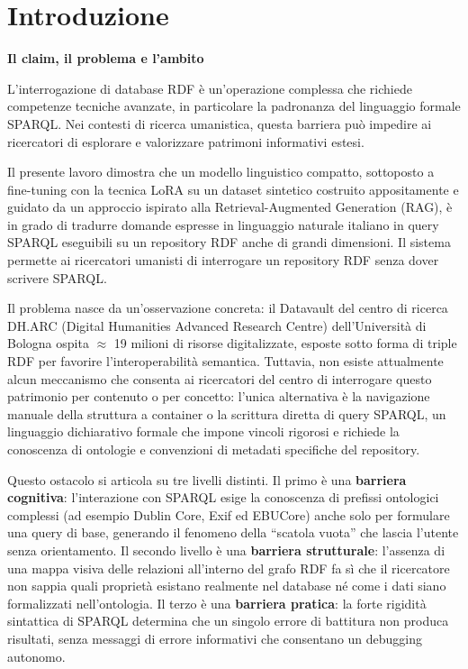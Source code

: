 \newpage
\chapter{Introduzione}\label{chap:introduzione}

\textbf{Il claim, il problema e l'ambito}

L'interrogazione di database RDF è un'operazione complessa che richiede competenze tecniche avanzate, in particolare la padronanza del linguaggio formale SPARQL\@. Nei contesti di ricerca umanistica, questa barriera può impedire ai ricercatori di esplorare e valorizzare patrimoni informativi estesi.

Il presente lavoro dimostra che un modello linguistico compatto, sottoposto a fine-tuning con la tecnica LoRA su un dataset sintetico costruito appositamente e guidato da un approccio ispirato alla Retrieval-Augmented Generation (RAG), è in grado di tradurre domande espresse in linguaggio naturale italiano in query SPARQL eseguibili su un repository RDF anche di grandi dimensioni. Il sistema permette ai ricercatori umanisti di interrogare un repository RDF senza dover scrivere SPARQL\@.

Il problema nasce da un'osservazione concreta: il Datavault del centro di ricerca DH.ARC (Digital Humanities Advanced Research Centre) dell'Università di Bologna ospita $\approx$ 19 milioni di risorse digitalizzate, esposte sotto forma di triple RDF per favorire l'interoperabilità semantica. Tuttavia, non esiste attualmente alcun meccanismo che consenta ai ricercatori del centro di interrogare questo patrimonio per contenuto o per concetto: l'unica alternativa è la navigazione manuale della struttura a container o la scrittura diretta di query SPARQL, un linguaggio dichiarativo formale che impone vincoli rigorosi e richiede la conoscenza di ontologie e convenzioni di metadati specifiche del repository\cite{Vas25}\cite{Vas24}.

Questo ostacolo si articola su tre livelli distinti. Il primo è una \textbf{barriera cognitiva}: l'interazione con SPARQL esige la conoscenza di prefissi ontologici complessi (ad esempio Dublin Core, Exif ed EBUCore) anche solo per formulare una query di base, generando il fenomeno della ``scatola vuota'' che lascia l'utente senza orientamento. Il secondo livello è una \textbf{barriera strutturale}: l'assenza di una mappa visiva delle relazioni all'interno del grafo RDF fa sì che il ricercatore non sappia quali proprietà esistano realmente nel database né come i dati siano formalizzati nell'ontologia. Il terzo è una \textbf{barriera pratica}: la forte rigidità sintattica di SPARQL determina che un singolo errore di battitura non produca risultati, senza messaggi di errore informativi che consentano un debugging autonomo.

